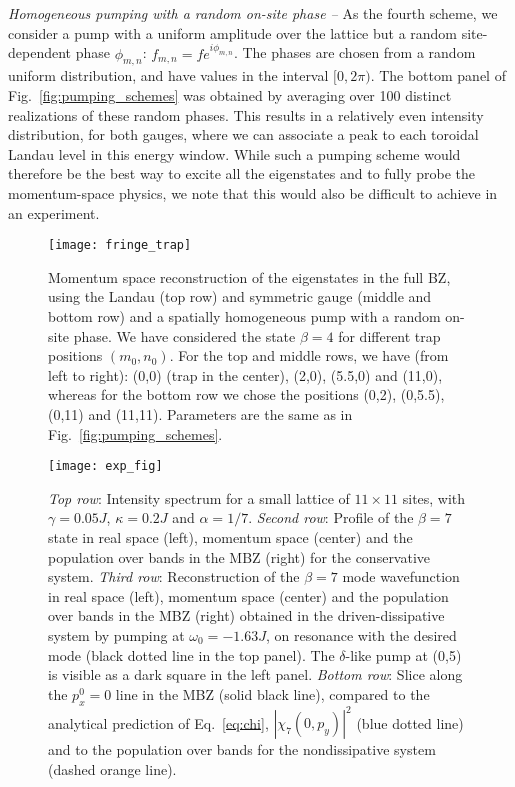 {\em{Homogeneous pumping with a random on-site phase --}} As the
fourth scheme, we consider a pump with a uniform amplitude over the
lattice but a random site-dependent phase $\phi_{m,n}$:
$f_{m,n}=fe^{i\phi_{m,n}}$. The phases are chosen from a random
uniform distribution, and have values in the interval $[0,2\pi)$. The
bottom panel of Fig.~\ref{fig:pumping_schemes} was obtained by
averaging over 100 distinct realizations of these random phases. This
results in a relatively even intensity distribution, for both gauges,
where we can associate a peak to each toroidal Landau level in this
energy window. While such a pumping scheme would therefore be the best
way to excite all the eigenstates and to fully probe the
momentum-space physics, we note that this would also be difficult to
achieve in an experiment.
%
\begin{figure}[htb] \centering
  \texttt{[image: fringe\_trap]}
  \caption{Momentum space reconstruction of the eigenstates in the
full BZ, using the Landau (top row) and symmetric gauge (middle and
bottom row) and a spatially homogeneous pump with a random on-site
phase. We have considered the state $\beta = 4$ for different trap
positions $(m_0, n_0)$. For the top and middle rows, we have (from
left to right): (0,0) (trap in the center), (2,0), (5.5,0) and (11,0),
whereas for the bottom row we chose the positions (0,2), (0,5.5),
(0,11) and (11,11). Parameters are the same as in
Fig.~\ref{fig:pumping_schemes}.}
  \label{fig:moving_trap}
\end{figure}
%
\begin{figure}[htb] \centering
  \texttt{[image: exp\_fig]}
  \caption{\emph{Top row}: Intensity spectrum for a small lattice of
    $11 \times 11$ sites, with $\gamma = 0.05 J$, $\kappa = 0.2 J$ and
    $\alpha=1/7$.  \emph{Second row}: Profile of the $\beta=7$ state
    in real space (left), momentum space (center) and the population
    over bands in the MBZ (right) for the conservative system.
    \emph{Third row}: Reconstruction of the $\beta=7$ mode
    wavefunction in real space (left), momentum space (center) and the
    population over bands in the MBZ (right) obtained in the
    driven-dissipative system by pumping at $\omega_0 = -1.63 J$, on
    resonance with the desired mode (black dotted line in the top
    panel).  The $\delta$-like pump at (0,5) is visible as a dark
    square in the left panel.  \emph{Bottom row}: Slice along the
    $p_x^0 = 0$ line in the MBZ (solid black line), compared to the
    analytical prediction of Eq.~\eqref{eq:chi}, $|\chi_7(0,p_y)|^2$
    (blue dotted line) and to the population over bands for the
    nondissipative system (dashed orange line).}
  \label{fig:exp}
\end{figure}

